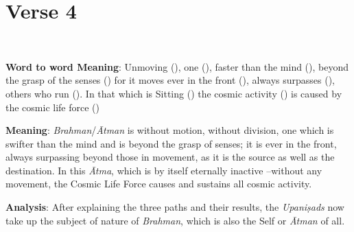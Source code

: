 \chapter{Verse 4}

\begin{moolashloka}
\\
\end{moolashloka}

\textbf{Word to word Meaning}: Unmoving (), one (), faster than the mind (), beyond the grasp of the senses () for it moves ever in the front (), always surpasses (), others who run (). In that which is Sitting () the cosmic activity () is caused by the cosmic life force ()

\textbf{Meaning}: \emph{Brahman}/\emph{Ātman} is without motion, without division, one which is swifter than the mind and is beyond the grasp of senses; it is ever in the front, always surpassing beyond those in movement, as it is the source as well as the destination. In this \emph{Ātma}, which is by itself eternally inactive --without any movement, the Cosmic Life Force causes and sustains all cosmic activity.

\textbf{Analysis}: After explaining the three paths and their results, the \emph{Upaniṣads} now take up the subject of nature of \emph{Brahman}, which is also the Self or \emph{Ātman} of all.

